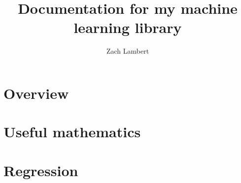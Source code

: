 \documentclass[10pt]{article}
\title{Documentation for my machine learning library}
\author{Zach Lambert}
\begin{document}
\begin{centering}
\huge{\@title}

\large{\@author}

\end{centering}


\section{Overview}


\section{Useful mathematics}


\section{Regression}

\end{document}
